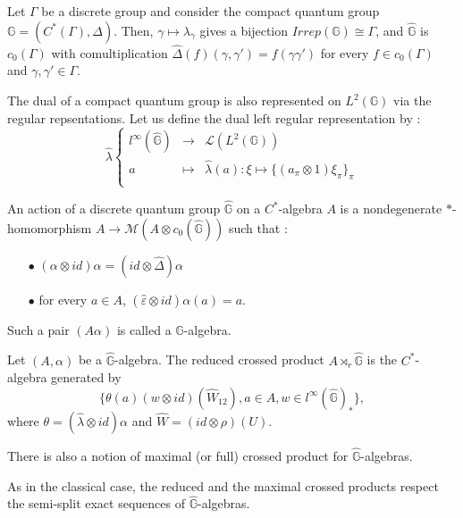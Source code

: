 \begin{Expl} Let $\Gamma$ be a discrete group and consider the compact quantum group $\mathbb G=(C^*(\Gamma),\Delta)$. Then, $\gamma\mapsto \lambda_\gamma$ gives a bijection $Irrep(\mathbb G)\cong \Gamma$, and $\hat{\mathbb G}$ is $c_0(\Gamma)$ with comultiplication $\hat\Delta (f)(\gamma,\gamma') = f(\gamma\gamma')$ for every $f\in c_0(\Gamma)$ and $\gamma,\gamma'\in\Gamma$.
\end{Expl}

The dual of a compact quantum group is also represented on $L^2(\mathbb G)$ via the regular repsentations. Let us define the dual left regular representation by :
\[\hat\lambda\left\{\begin{array}{rcl}
l^\infty(\hat{\mathbb G}) & \rightarrow & \mathcal L(L^2(\mathbb G)) \\
a	& \mapsto & \hat\lambda (a) : \xi \mapsto \{(a_\pi\otimes 1)\xi_\pi\}_\pi\\
\end{array}\right.\]


\begin{definition} An action of a discrete quantum group $\hat{\mathbb G}$ on a $C^*$-algebra $A$ is a nondegenerate $*$-homomorphism $A\rightarrow \mathcal M(A\otimes c_0(\hat{\mathbb G}))$ such that :
\begin{itemize}
\item[$\bullet$] $(\alpha \otimes id )\alpha = (id\otimes \hat\Delta) \alpha$
\item[$\bullet$] for every $a\in A$, $(\hat\varepsilon \otimes id)\alpha(a) = a$.
\end{itemize}
Such a pair $(A\alpha)$ is called a $\hat{\mathbb G}$-algebra.
\end{definition}

\begin{definition} Let $(A,\alpha)$ be a $\hat{\mathbb G}$-algebra. The reduced crossed product $A\rtimes_r \hat{\mathbb G}$ is the $C^*$-algebra generated by 
\[\{\theta(a)(w\otimes id)(\hat W_{12}), a\in A , w\in l^\infty(\hat{\mathbb G})_* \},\]
where $\theta = (\hat\lambda \otimes id)\alpha$ and $\hat W = (id\otimes \rho)(U)$.  
\end{definition}

\begin{rk}
There is also a notion of maximal (or full) crossed product for $\hat{\mathbb G}$-algebras.
\end{rk}

\begin{rk}
As in the classical case, the reduced and the maximal crossed products respect the semi-split exact sequences of $\hat{\mathbb G}$-algebras.
\end{rk}

